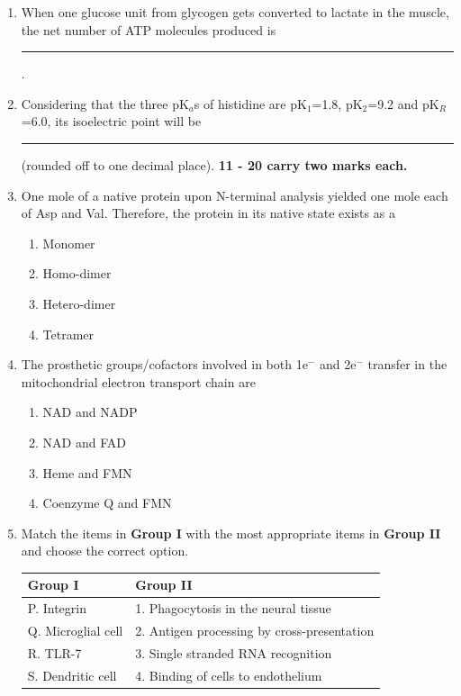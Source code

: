 \documentclass[journal,12pt,onecolumn]{IEEEtran}
\begin{document}
\begin{enumerate}[label=\arabic*.]
\item When one glucose unit from glycogen gets converted to lactate in the muscle, the net number of ATP molecules produced is \rule{3cm}{0.1pt}.

\item Considering that the three pK$_a$s of histidine are pK$_1$=1.8, pK$_2$=9.2 and pK$_R$=6.0, its isoelectric point will be \rule{3cm}{0.1pt} (rounded off to one decimal place).
\noindent \textbf{11 - 20 carry two marks each.}
\item One mole of a native protein upon N-terminal analysis yielded one mole each of Asp and Val. Therefore, the protein in its native state exists as a
\begin{multicols}{2}
\begin{enumerate}[label=(\Alph*)]
    \item Monomer
    \item Homo-dimer
    \item Hetero-dimer
    \item Tetramer
\end{enumerate}
\end{multicols}

\item The prosthetic groups/cofactors involved in both 1e$^-$ and 2e$^-$ transfer in the mitochondrial electron transport chain are
\begin{multicols}{2}
\begin{enumerate}[label=(\Alph*)]
    \item NAD and NADP
    \item NAD and FAD
    \item Heme and FMN
    \item Coenzyme Q and FMN
\end{enumerate}
\end{multicols}

\item Match the items in \textbf{Group I} with the most appropriate items in \textbf{Group II} and choose the correct option.

\begin{center}
\begin{tabular}{|l|l|}
\hline
 Group I & Group II \\
\hline
P. Integrin & 1. Phagocytosis in the neural tissue \\
Q. Microglial cell & 2. Antigen processing by cross-presentation \\
R. TLR-7 & 3. Single stranded RNA recognition \\
S. Dendritic cell & 4. Binding of cells to endothelium \\
\hline
\end{tabular}
\end{center}


\end{enumerate}
\end{document}

